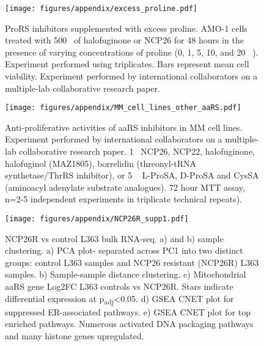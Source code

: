 \begin{figure}[h]
\centering
\texttt{[image: figures/appendix/excess\_proline.pdf]}
\caption[ProRS inhibitor treatment with proline supplementation]{ProRS inhibitors supplemented with excess proline.
AMO-1 cells treated with 500\si{\nano\Molar} of halofuginone or NCP26 for 48 hours in the presence of varying concentrations of proline (0, 1, 5, 10, and 20 \si{\milli\Molar}).
Experiment performed using triplicates.
Bars represent mean cell viability.
Experiment performed by international collaborators on a multiple-lab collaborative research paper\cite{bottpreclinical2022}.
}
\label{fig:sup_proline_excess}
\end{figure}

\begin{figure}[h]
\centering
\texttt{[image: figures/appendix/MM\_cell\_lines\_other\_aaRS.pdf]}
\caption[Other aaRS inhibitors' anti-proliferative activity in MM cell lines]{Anti-proliferative activities of aaRS inhibitors in MM cell lines.
Experiment performed by international collaborators on a multiple-lab collaborative research paper\cite{bottpreclinical2022}.
1\si{\micro\Molar} NCP26, NCP22, halofuginone, halofuginol (MAZ1805), borrelidin (threonyl-tRNA synthetase/ThrRS inhibitor), or 5 \si{\micro\Molar} L-ProSA, D-ProSA and CysSA (aminoacyl adenylate substrate analogues).
72 hour MTT assay, n=2-5 independent experiments in triplicate technical repeats).
}
\label{fig:sup_cell_line_aaRS}
\end{figure}

\begin{figure}[h]
\centering
\texttt{[image: figures/appendix/NCP26R\_supp1.pdf]}
\caption[NCP26R bulk RNA-seq extra figures]{NCP26R vs control L363 bulk RNA-seq.
a) and b) sample clustering.
a) PCA plot- separated across PC1 into two distinct groups: control L363 samples and NCP26 resistant (NCP26R) L363 samples.
b) Sample-sample distance clustering.
c) Mitochondrial aaRS gene Log2FC L363 controls vs NCP26R. Stars indicate differential expression at p\textsubscript{adj}<0.05.
d) GSEA CNET plot for suppressed ER-associated pathways.
e) GSEA CNET plot for top enriched pathways. Numerous activated DNA packaging pathways and many histone genes upregulated.
}
\label{fig:sup_NCP26R_bulk}
\end{figure}

\afterpage{\clearpage}


